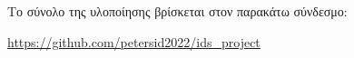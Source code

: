 Το σύνολο της υλοποίησης βρίσκεται στον παρακάτω σύνδεσμο:
\begin{center}
\url{https://github.com/petersid2022/ids_project}
\end{center}